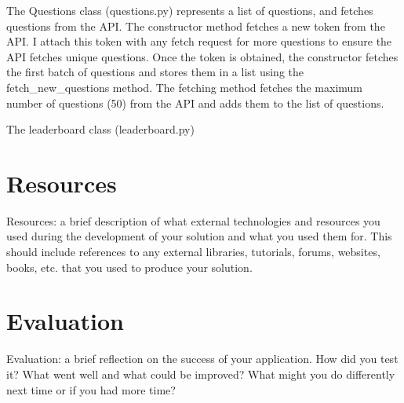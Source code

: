 \documentclass[12pt]{article}
\begin{document}
The Questions class (questions.py) represents a list of questions, and fetches questions from the API.
The constructor method fetches a new token from the API. I attach this token with any fetch request for more questions to ensure the API fetches unique questions. Once the token is obtained, the constructor fetches the first batch of questions and stores them in a list using the fetch\_new\_questions method.
The fetching method fetches the maximum number of questions (50) from the API and adds them to the list of questions. 

The leaderboard class (leaderboard.py) 
\section{Resources}
Resources: a brief description of what external technologies and resources you used during the development of your solution and what you used them for. This should include references to any external libraries, tutorials, forums, websites, books, etc. that you used to produce your solution.

\section{Evaluation}
Evaluation: a brief reflection on the success of your application. How did you test it? What went well and what could be improved? What might you do differently next time or if you had more time?
\end{document}
